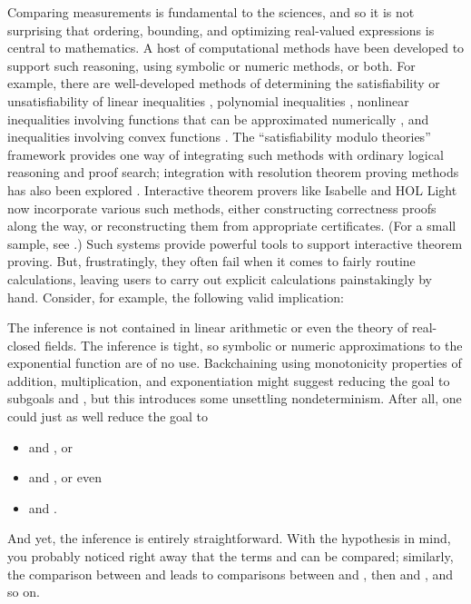 \documentclass[runningheds]{llncs}
\begin{document}
Comparing measurements is fundamental to the sciences, and so it is not surprising that ordering, bounding, and optimizing real-valued expressions is central to mathematics. A host of computational methods have been developed to support such reasoning, using symbolic or numeric methods, or both. For example, there are well-developed methods of determining the satisfiability or unsatisfiability of linear inequalities \cite{pugh:92} \cite{schrijver:86}, polynomial inequalities \cite{basu:et:al:03}, nonlinear inequalities involving functions that can be approximated numerically \cite{gao:et:al:12} \cite{moore:et:al:09}, and inequalities involving convex functions \cite{boyd:vandenberghe:04}. The ``satisfiability modulo theories'' framework \cite{barrett:et:al:08} \cite{nelson:oppen:79} provides one way of integrating such methods with ordinary logical reasoning and proof search; integration with resolution theorem proving methods has also been explored \cite{akbarpour:paulson:08} \cite{prevosto:waldmann:06}. Interactive theorem provers like Isabelle \cite{nipkow:et:al:02} and HOL Light \cite{harrison:07c} now incorporate various such methods, either constructing correctness proofs along the way, or reconstructing them from appropriate certificates. (For a small sample, see \cite{blanchette:et:al:11} \cite{chaieb:nipkow:08} \cite{harrison:07b} \cite{mclaughlin:harrison:05}.)
Such systems provide powerful tools to support interactive theorem proving. But, frustratingly, they often fail when it comes to fairly routine calculations, leaving users to carry out explicit calculations painstakingly by hand. Consider, for example, the following valid implication:

The inference is not contained in linear arithmetic or even the theory of real-closed fields. The inference is tight, so symbolic or numeric approximations to the exponential function are of no use. Backchaining using monotonicity properties of addition, multiplication, and exponentiation might suggest reducing the goal to subgoals  and , but this introduces some unsettling nondeterminism. After all, one could just as well reduce the goal to
\begin{itemize}
\item  and , or
\item  and , or even
\item  and .
\end{itemize}
And yet, the inference is entirely straightforward. With the hypothesis  in mind, you probably noticed right away that the terms  and  can be compared; similarly, the comparison between  and  leads to comparisons between  and , then  and , and so on. 
\end{document}
